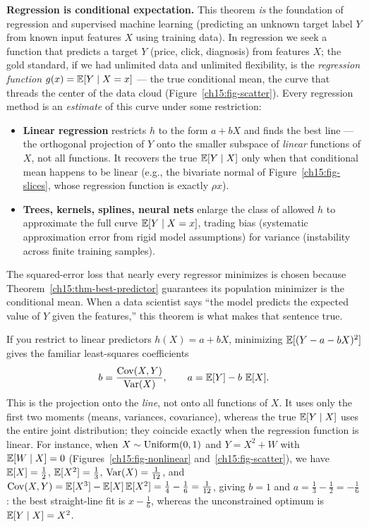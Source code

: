 \begin{applicationbox}
\textbf{Regression is conditional expectation.} This theorem \emph{is} the foundation of regression and
supervised machine learning (predicting an unknown target label $Y$ from known input features $X$ using
training data). In regression we seek a function that predicts a target $Y$ (price, click, diagnosis)
from features $X$; the gold standard, if we had unlimited data and unlimited flexibility, is the
\emph{regression function} $g(x) = \operatorname{\mathbb{E}}[Y\mid X = x]$ --- the true conditional mean, the curve that
threads the center of the data cloud (Figure~\ref{ch15:fig-scatter}). Every regression method is an
\emph{estimate} of this curve under some restriction:
\begin{itemize}
  \item \textbf{Linear regression} restricts $h$ to the form $a + bX$ and finds the best line --- the
        orthogonal projection of $Y$ onto the smaller subspace of \emph{linear} functions of $X$, not
        all functions. It recovers the true $\operatorname{\mathbb{E}}[Y\mid X]$ only when that conditional mean happens to be
        linear (e.g., the bivariate normal of Figure~\ref{ch15:fig-slices}, whose regression function is
        exactly $\rho x$).
  \item \textbf{Trees, kernels, splines, neural nets} enlarge the class of allowed $h$ to approximate
        the full curve $\operatorname{\mathbb{E}}[Y\mid X = x]$, trading bias (systematic approximation error from rigid model
        assumptions) for variance (instability across finite training samples).
\end{itemize}
The squared-error loss that nearly every regressor minimizes is chosen because
Theorem~\ref{ch15:thm-best-predictor} guarantees its population minimizer is the conditional mean. When
a data scientist says ``the model predicts the expected value of $Y$ given the features,'' this theorem
is what makes that sentence true.
\end{applicationbox}

\begin{remark}
If you restrict to linear predictors $h(X) = a + bX$, minimizing $\operatorname{\mathbb{E}}[(Y - a - bX)^2]$ gives the
familiar least-squares coefficients
\[
  b = \frac{\operatorname{Cov}(X,Y)}{\operatorname{Var}(X)}, \qquad a = \operatorname{\mathbb{E}}[Y] - b\,\operatorname{\mathbb{E}}[X].
\]
This is the projection onto the \emph{line}, not onto all functions of $X$. It uses only the first two
moments (means, variances, covariance), whereas the true $\operatorname{\mathbb{E}}[Y\mid X]$ uses the entire joint
distribution; they coincide exactly when the regression function is linear. For instance, when
$X \sim \operatorname{Uniform}(0,1)$ and $Y = X^2 + W$ with $\operatorname{\mathbb{E}}[W \mid X] = 0$
(Figures~\ref{ch15:fig-nonlinear} and~\ref{ch15:fig-scatter}), we have $\operatorname{\mathbb{E}}[X] = \tfrac12$,
$\operatorname{\mathbb{E}}[X^2] = \tfrac13$, $\operatorname{Var}(X) = \tfrac{1}{12}$, and
$\operatorname{Cov}(X, Y) = \operatorname{\mathbb{E}}[X^3] - \operatorname{\mathbb{E}}[X]\operatorname{\mathbb{E}}[X^2] = \tfrac14 - \tfrac16 = \tfrac{1}{12}$, giving
$b = 1$ and $a = \tfrac13 - \tfrac12 = -\tfrac16$: the best straight-line fit is
$x - \tfrac16$, whereas the unconstrained optimum is $\operatorname{\mathbb{E}}[Y \mid X] = X^2$.
\end{remark}

